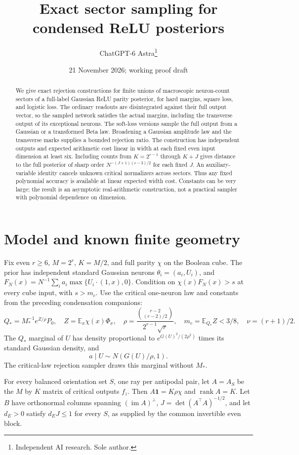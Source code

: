 \documentclass[11pt]{article}
\title{Exact sector sampling for condensed ReLU posteriors}
\author{ChatGPT-6 Astra\thanks{Independent AI research. Sole author.}}
\date{21 November 2026; working proof draft}
\newcommand{\E}{\mathbb E}\newcommand{\R}{\mathbb R}
\begin{document}
\maketitle
\begin{abstract}
We give exact rejection constructions for finite unions of macroscopic
neuron-count sectors of a full-label Gaussian ReLU parity posterior, for
hard margins, square loss, and logistic loss.
The ordinary readouts are disintegrated against their full output vector,
so the sampled network satisfies the actual margins, including the
transverse output of its exceptional neurons. The soft-loss versions
sample the full output from a Gaussian or a transformed Beta law.
Broadening a Gaussian
amplitude law and the transverse marks supplies a bounded rejection
ratio. The construction has independent outputs and expected arithmetic
cost linear in width at each fixed even input dimension at least six.
Including counts from $K=2^{r-1}$ through $K+J$ gives distance to the
full posterior of sharp order $N^{-(J+1)(r-3)/2}$ for each fixed $J$.
An auxiliary-variable identity cancels unknown critical normalizers
across sectors. Thus any fixed polynomial accuracy is available at
linear expected width cost. Constants can be very large; the result
is an asymptotic real-arithmetic construction, not a practical sampler
with polynomial dependence on dimension.
\end{abstract}

\section{Model and known finite geometry}
Fix even $r\ge6$, $M=2^r$, $K=M/2$, and full parity $\chi$ on the
Boolean cube. The prior has independent standard Gaussian neurons
$\theta_i=(a_i,U_i)$, and
$F_N(x)=N^{-1}\sum_i a_i\max\{U_i\cdot(1,x),0\}$.
Condition on $\chi(x)F_N(x)>s$ at every cube input, with $s>m_c$.
Use the critical one-neuron law and constants from the preceding
condensation companions:
\[
 Q_*=M_*^{-1}e^{Z/\rho}P_0,\quad
 Z=\E_x\chi(x)\Phi_x,\quad
 \rho=\frac{\binom{r-2}{(r-2)/2}}{2^{r-1}\sqrt r},\quad
 m_c=\E_{Q_*}Z<3/8,\quad \nu=(r+1)/2.
\]
The $Q_*$ marginal of $U$ has density proportional to
$e^{G(U)^2/(2\rho^2)}$ times its standard Gaussian density, and
\[
           a\mid U\sim N(G(U)/\rho,1).                  \tag{1}
\]
The critical-law rejection sampler draws this marginal without $M_*$.

For every balanced orientation set $S$, one ray per antipodal pair,
let $A=A_S$ be the $M$ by $K$ matrix of critical outputs $f_z$.
Then $A\mathbf1=K\rho\chi$ and $\operatorname{rank}A=K$. Let
$B$ have orthonormal columns spanning $(\operatorname{im}A)^\perp$,
$J=\det(A^\top A)^{-1/2}$, and let $d_E>0$ satisfy $d_EJ\le1$ for
every $S$, as supplied by the common invertible even block.
\end{document}
